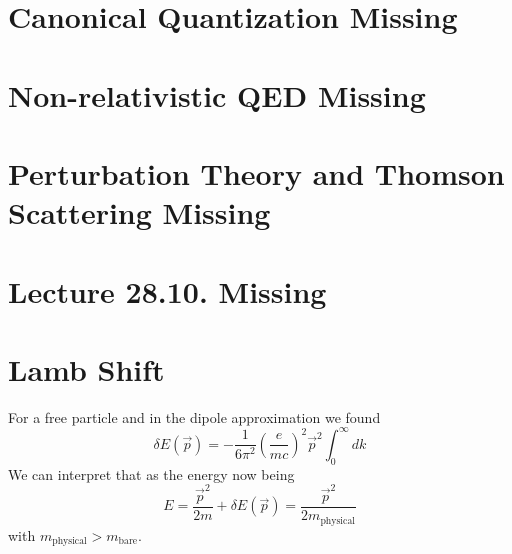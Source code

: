 \documentclass{report}
\begin{document}
\section{Canonical Quantization Missing}
\section{Non-relativistic QED Missing}
\section{Perturbation Theory and Thomson Scattering Missing}
\section*{Lecture 28.10. Missing}
\section{Lamb Shift}
For a free particle and in the dipole approximation we found \[
  \delta E\left( \vec{p} \right) = - \frac{1}{6 \pi^2} \left( \frac{e}{mc} \right) ^2 \vec{p}^2 \int_0^{\infty} dk
\] 
We can interpret that as the energy now being \[
  E = \frac{\vec{p}^2}{2m} + \delta E\left( \vec{p} \right) = \frac{\vec{p}^2}{2 m_{\text{physical}}}
\] with $m_{\text{physical}} > m_{\text{bare}}$.
\end{document}

